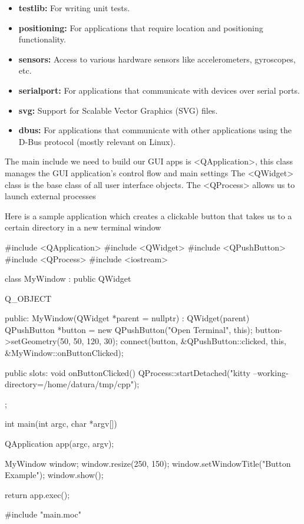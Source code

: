 \documentclass{report}
\begin{document}
\begin{itemize}
\begin{itemize}
                \item \textbf{testlib:} For writing unit tests.
                \item \textbf{positioning:} For applications that require location and positioning functionality.
                \item \textbf{sensors:} Access to various hardware sensors like accelerometers, gyroscopes, etc.
                \item \textbf{serialport:} For applications that communicate with devices over serial ports.
                \item \textbf{svg:} Support for Scalable Vector Graphics (SVG) files.
                \item \textbf{dbus:} For applications that communicate with other applications using the D-Bus protocol (mostly relevant on Linux). 
            \end{itemize}
    \end{itemize}

    \pagebreak
    \bigbreak \noindent 
    The main include we need to build our GUI apps is <QApplication>, this class manages the GUI application's control flow and main settings
    \bigbreak \noindent 
    The <QWidget> class is the base class of all user interface objects. 
    \bigbreak \noindent 
    The <QProcess> allows us to launch external processes

    \bigbreak \noindent 
    \bigbreak \noindent 
    Here is a sample application which creates a clickable button that takes us to a certain directory in a new terminal window
    \bigbreak \noindent 
    \begin{cppcode}
#include <QApplication>
#include <QWidget>
#include <QPushButton>
#include <QProcess>
#include <iostream>

class MyWindow : public QWidget {
    Q_OBJECT

public:
    MyWindow(QWidget *parent = nullptr) : QWidget(parent) {
        QPushButton *button = new QPushButton("Open Terminal", this);
        button->setGeometry(50, 50, 120, 30);
        connect(button, &QPushButton::clicked, this, &MyWindow::onButtonClicked);
    }

public slots:
    void onButtonClicked() {
        QProcess::startDetached("kitty --working-directory=/home/datura/tmp/cpp");
    }
};

int main(int argc, char *argv[]) {
    QApplication app(argc, argv);

    MyWindow window;
    window.resize(250, 150);
    window.setWindowTitle("Button Example");
    window.show();

    return app.exec();
}

#include "main.moc"
    \end{cppcode}
\end{document}
